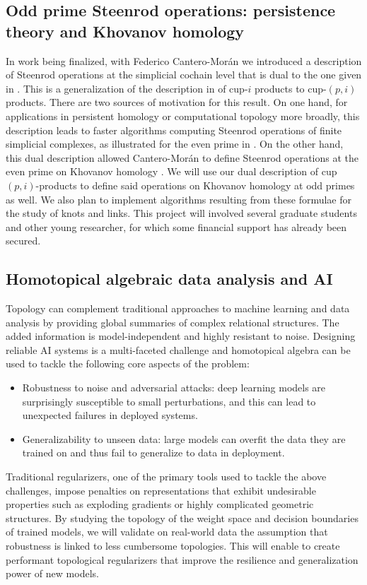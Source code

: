 \subsection{Odd prime Steenrod operations: persistence theory and Khovanov homology} \label{ss:odd prime steenrod operations}

In work being finalized, with Federico Cantero-Mor\'{a}n we introduced a description of Steenrod operations at the simplicial cochain level that is dual to the one given in \cite{medina2021maysteenrod}.
This is a generalization of the description in \cite{medina2021newformulas} of cup-$i$ products to cup-$(p,i)$ products.
There are two sources of motivation for this result.
On one hand, for applications in persistent homology or computational topology more broadly, this description leads to faster algorithms computing Steenrod operations of finite simplicial complexes, as illustrated for the even prime in \cite{medina2021newformulas}.
On the other hand, this dual description allowed Cantero-Mor\'an to define Steenrod operations at the even prime on Khovanov homology \cite{cantero-moran2020khovanov}.
We will use our dual description of cup $(p,i)$-products to define said operations on Khovanov homology at odd primes as well.
We also plan to implement algorithms resulting from these formulae for the study of knots and links.
This project will involved several graduate students and other young researcher, for which some financial support has already been secured.

\subsection{Homotopical algebraic data analysis and AI} \label{ss:ai}

Topology can complement traditional approaches to machine learning and data analysis by providing global summaries of complex relational structures.
The added information is model-independent and highly resistant to noise.
Designing reliable AI systems is a multi-faceted challenge and homotopical algebra can be used to tackle the following core aspects of the problem:

\begin{itemize}
	\item Robustness to noise and adversarial attacks: deep learning models are surprisingly susceptible to small perturbations, and this can lead to unexpected failures in deployed systems.
	\item Generalizability to unseen data: large models can overfit the data they are trained on and thus fail to generalize to data in deployment.
\end{itemize}
Traditional regularizers, one of the primary tools used to tackle the above challenges, impose penalties on representations that exhibit undesirable properties such as exploding gradients or highly complicated geometric structures.
By studying the topology of the weight space and decision boundaries of trained models, we will validate on real-world data the assumption that robustness is linked to less cumbersome topologies.
This will enable to create performant topological regularizers that improve the resilience and generalization power of new models.

